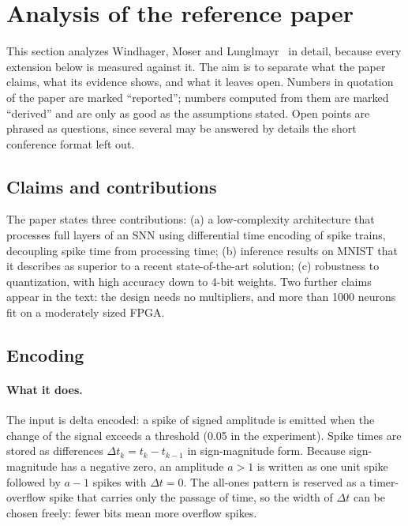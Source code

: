 \section{Analysis of the reference paper}
\label{sec:paper}
This section analyzes Windhager, Moser and Lunglmayr~\cite{windhager2024} in detail, because every extension below is measured against it. The aim is to separate what the paper claims, what its evidence shows, and what it leaves open. Numbers in quotation of the paper are marked ``reported''; numbers computed from them are marked ``derived'' and are only as good as the assumptions stated. Open points are phrased as questions, since several may be answered by details the short conference format left out.

\subsection{Claims and contributions}
The paper states three contributions: (a) a low-complexity architecture that processes full layers of an SNN using differential time encoding of spike trains, decoupling spike time from processing time; (b) inference results on MNIST that it describes as superior to a recent state-of-the-art solution; (c) robustness to quantization, with high accuracy down to 4-bit weights. Two further claims appear in the text: the design needs no multipliers, and more than 1000 neurons fit on a moderately sized FPGA.

\subsection{Encoding}
\paragraph{What it does.} The input is delta encoded: a spike of signed amplitude is emitted when the change of the signal exceeds a threshold (0.05 in the experiment). Spike times are stored as differences $\Delta t_k=t_k-t_{k-1}$ in sign-magnitude form. Because sign-magnitude has a negative zero, an amplitude $a>1$ is written as one unit spike followed by $a-1$ spikes with $\Delta t=0$. The all-ones pattern is reserved as a timer-overflow spike that carries only the passage of time, so the width of $\Delta t$ can be chosen freely: fewer bits mean more overflow spikes.

